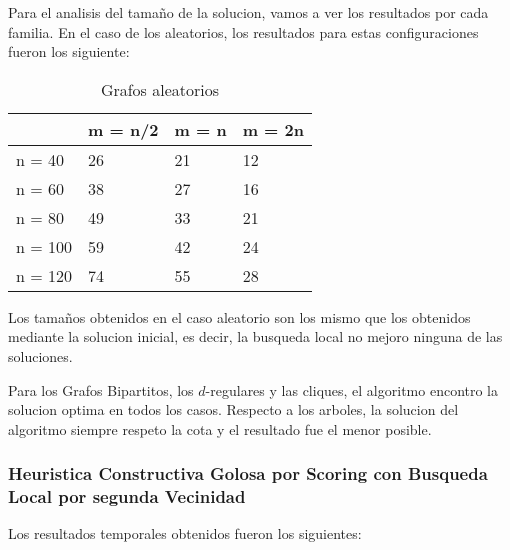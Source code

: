 \newpage

Para el analisis del tamaño de la solucion, vamos a ver los resultados por cada familia. En el caso de los aleatorios, los resultados para estas configuraciones fueron los siguiente:

\begin{table}[]
\centering
\caption{Grafos aleatorios}
\label{my-label}
\begin{tabular}{|l|lll|}
\hline
        & \multicolumn{1}{l|}{m = n/2} & \multicolumn{1}{l|}{m = n} & m = 2n \\ \hline
n = 40  & 26                           & 21                         & 12     \\ \cline{1-1}
n = 60  & 38                           & 27                         & 16     \\ \cline{1-1}
n = 80  & 49                           & 33                         & 21     \\ \cline{1-1}
n = 100 & 59                           & 42                         & 24     \\ \cline{1-1}
n = 120 & 74                           & 55                         & 28     \\ \hline
\end{tabular}
\end{table}

Los tamaños obtenidos en el caso aleatorio son los mismo que los obtenidos mediante la solucion inicial, es decir, la busqueda local no mejoro ninguna de las soluciones.

Para los Grafos Bipartitos, los $d$-regulares y las cliques, el algoritmo encontro la solucion optima en todos los casos. Respecto a los arboles, la solucion del algoritmo siempre respeto la cota y el resultado fue el menor posible.

\subsubsection{Heuristica Constructiva Golosa por Scoring con Busqueda Local por segunda Vecinidad}

Los resultados temporales obtenidos fueron los siguientes:

